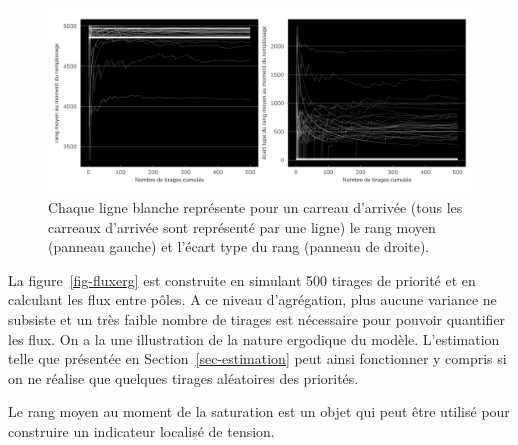 \documentclass[
  10pt,
  a4paper,
  numbers=noendperiod,
  DIV=12]{scrartcl}
\begin{document}
\begin{figure}[htb]

{\centering \includegraphics[width=1\textwidth,height=\textheight]{output/g_rangns.png}

}

\caption[Rang au moment de la saturation]{\label{fig-rangerg}Chaque
ligne blanche représente pour un carreau d'arrivée (tous les carreaux
d'arrivée sont représenté par une ligne) le rang moyen (panneau gauche)
et l'écart type du rang (panneau de droite).}

\end{figure}

La figure~\ref{fig-fluxerg} est construite en simulant 500 tirages de
priorité et en calculant les flux entre pôles. A ce niveau d'agrégation,
plus aucune variance ne subsiste et un très faible nombre de tirages est
nécessaire pour pouvoir quantifier les flux. On a la une illustration de
la nature ergodique du modèle. L'estimation telle que présentée en
Section~\ref{sec-estimation} peut ainsi fonctionner y compris si on ne
réalise que quelques tirages aléatoires des priorités.

Le rang moyen au moment de la saturation est un objet qui peut être
utilisé pour construire un indicateur localisé de tension.
\end{document}
